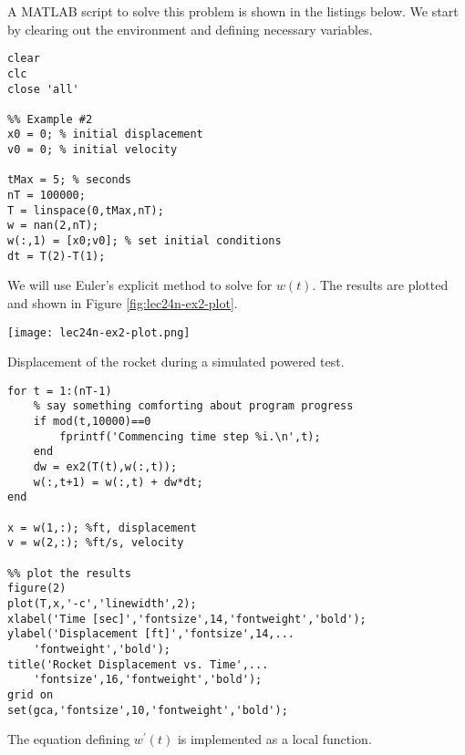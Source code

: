 A MATLAB script to solve this problem is shown in the listings below. We start by clearing out the environment and defining necessary variables.
\begin{lstlisting}[style=myMatlab,name=lec24n-ex2]
clear
clc
close 'all'

%% Example #2
x0 = 0; % initial displacement
v0 = 0; % initial velocity

tMax = 5; % seconds
nT = 100000;
T = linspace(0,tMax,nT);
w = nan(2,nT);
w(:,1) = [x0;v0]; % set initial conditions
dt = T(2)-T(1);

\end{lstlisting}
We will use Euler's explicit method to solve for $w(t)$.  The results are plotted and shown in Figure \ref{fig:lec24n-ex2-plot}. 
\begin{marginfigure}[5.0cm]
\texttt{[image: lec24n-ex2-plot.png]}
\caption{Displacement of the rocket during a simulated powered test.}
\label{fig:lec24n-ex2-plot}
\end{marginfigure}
\begin{lstlisting}[style=myMatlab,name=lec24n-ex2]
for t = 1:(nT-1)
    % say something comforting about program progress
    if mod(t,10000)==0
        fprintf('Commencing time step %i.\n',t);
    end
    dw = ex2(T(t),w(:,t));
    w(:,t+1) = w(:,t) + dw*dt;
end

x = w(1,:); %ft, displacement
v = w(2,:); %ft/s, velocity

%% plot the results
figure(2)
plot(T,x,'-c','linewidth',2);
xlabel('Time [sec]','fontsize',14,'fontweight','bold');
ylabel('Displacement [ft]','fontsize',14,...
    'fontweight','bold');
title('Rocket Displacement vs. Time',...
    'fontsize',16,'fontweight','bold');
grid on
set(gca,'fontsize',10,'fontweight','bold');
\end{lstlisting}
The equation defining $w^{\prime}(t)$ is implemented as a local function.
